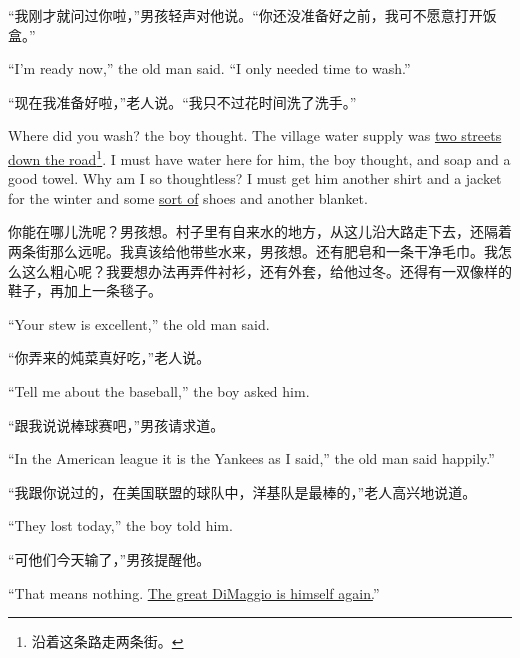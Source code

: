 \begin{paracol}{2}
“我刚才就问过你啦，”男孩轻声对他说。“你还没准备好之前，我可不愿意打开饭盒。”

\switchcolumn*

``I'm ready now,'' the old man said. ``I only needed time to wash.''

\switchcolumn

“现在我准备好啦，”老人说。“我只不过花时间洗了洗手。”

\switchcolumn*

Where did you wash? the boy thought. The village water \gls{supply} was
\uline{two streets down the road}\footnote{沿着这条路走两条街。}. I must have water here for him, the boy
thought, and \gls{soap} and a good \gls{towel}. Why am I so
\gls{thoughtless}? I must get him another shirt and a jacket for the winter
and some \uline{sort of} shoes and another blanket.

\switchcolumn

你能在哪儿洗呢？男孩想。村子里有自来水的地方，从这儿沿大路走下去，还隔着两条街那么远呢。我真该给他带些水来，男孩想。还有肥皂和一条干净毛巾。我怎么这么粗心呢？我要想办法再弄件衬衫，还有外套，给他过冬。还得有一双像样的鞋子，再加上一条毯子。

\switchcolumn*

``Your stew is excellent,'' the old man said.

\switchcolumn

“你弄来的炖菜真好吃，”老人说。

\switchcolumn*

``Tell me about the baseball,'' the boy asked him.

\switchcolumn

“跟我说说棒球赛吧，”男孩请求道。

\switchcolumn*

``In the American \Gls{league} it is the Yankees as I said,'' the old man said happily.''

\switchcolumn

“我跟你说过的，在美国联盟的球队中，洋基队是最棒的，”老人高兴地说道。

\switchcolumn*

``They lost today,'' the boy told him.

\switchcolumn

“可他们今天输了，”男孩提醒他。

\switchcolumn*

``That means nothing. \uline{The great DiMaggio is himself again.}''

\switchcolumn


\end{paracol}
